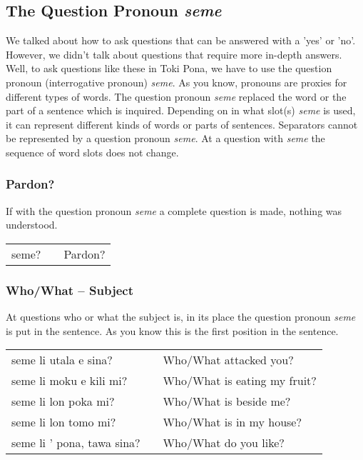 \newpage

\subsection*{The Question Pronoun \textit{seme}}
We talked about how to ask questions that can be answered with a 'yes' or 'no'.
However, we didn't talk about questions that require more in-depth answers.
Well, to ask questions like these in Toki Pona, we have to use the question pronoun (interrogative pronoun) \textit{seme}.
As you know, pronouns are proxies for different types of words.
The question pronoun \textit{seme} replaced the word or the part of a sentence which is inquired.
Depending on in what slot(s) \textit{seme} is used, it can represent different kinds of words or parts of sentences.
Separators cannot be represented by a question pronoun \textit{seme}.
At a question with \textit{seme} the sequence of word slots does not change.

\subsubsection*{Pardon?}
If with the question pronoun \textit{seme} a complete question is made, nothing was understood.

\begin{supertabular}{p{5,5cm}|ll}
    seme? &  & Pardon? \\
\end{supertabular}

\subsubsection*{Who/What -- Subject}
At questions who or what the subject is, in its place the question pronoun \textit{seme} is put in the sentence.
As you know this is the first position in the sentence.

\begin{supertabular}{p{5,5cm}|ll}
    seme li utala e sina?      &  & Who/What attacked you?       \\
    seme li moku e kili mi?    &  & Who/What is eating my fruit? \\
    seme li lon poka mi?       &  & Who/What is beside me?       \\
    seme li lon tomo mi?       &  & Who/What is in my house?     \\
    seme li ' pona, tawa sina? &  & Who/What do you like?        \\
\end{supertabular}

